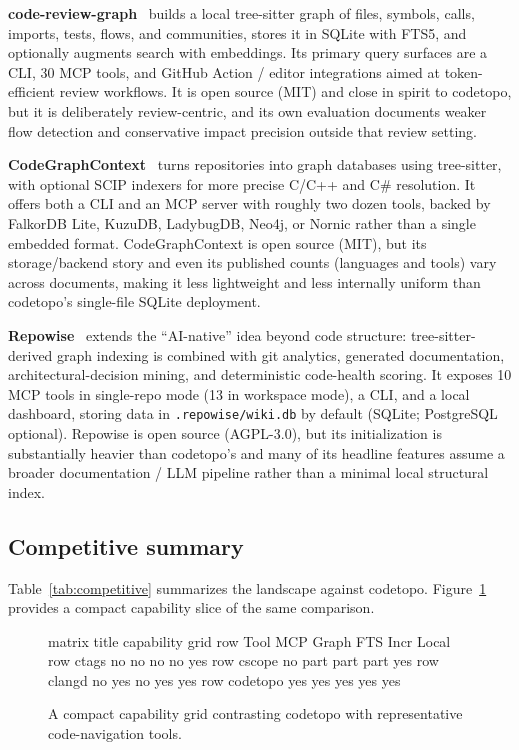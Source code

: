 \textbf{code-review-graph}~\cite{tirth2026codereviewgraph} builds a local
tree-sitter graph of files, symbols, calls, imports, tests, flows, and
communities, stores it in SQLite with FTS5, and optionally augments search with
embeddings. Its primary query surfaces are a CLI, 30 MCP tools, and GitHub
Action / editor integrations aimed at token-efficient review workflows. It is
open source (MIT) and close in spirit to codetopo, but it is deliberately
review-centric, and its own evaluation documents weaker flow detection and
conservative impact precision outside that review setting.

\textbf{CodeGraphContext}~\cite{codegraphcontext2025cgc} turns repositories
into graph databases using tree-sitter, with optional SCIP indexers for more
precise C/C++ and C\# resolution. It offers both a CLI and an MCP server with
roughly two dozen tools, backed by FalkorDB Lite, KuzuDB, LadybugDB, Neo4j, or
Nornic rather than a single embedded format. CodeGraphContext is open source
(MIT), but its storage/backend story and even its published counts (languages
and tools) vary across documents, making it less lightweight and less
internally uniform than codetopo's single-file SQLite deployment.

\textbf{Repowise}~\cite{repowise2026repowise} extends the ``AI-native'' idea
beyond code structure: tree-sitter-derived graph indexing is combined with git
analytics, generated documentation, architectural-decision mining, and
deterministic code-health scoring. It exposes 10 MCP tools in single-repo mode
(13 in workspace mode), a CLI, and a local dashboard, storing data in
\texttt{.repowise/wiki.db} by default (SQLite; PostgreSQL optional). Repowise
is open source (AGPL-3.0), but its initialization is substantially heavier than
codetopo's and many of its headline features assume a broader documentation /
LLM pipeline rather than a minimal local structural index.

\subsection{Competitive summary}

Table~\ref{tab:competitive} summarizes the landscape against codetopo.
Figure~\ref{fig:capability-grid} provides a compact capability slice of the
same comparison.

\begin{figure}[htbp]
  \centering
\begin{triton}
matrix
  title capability grid
  row Tool MCP Graph FTS Incr Local
  row ctags no no no no yes
  row cscope no part part part yes
  row clangd no yes no yes yes
  row codetopo yes yes yes yes yes
\end{triton}
  \caption{A compact capability grid contrasting codetopo with representative
           code-navigation tools.}
  \label{fig:capability-grid}
\end{figure}


